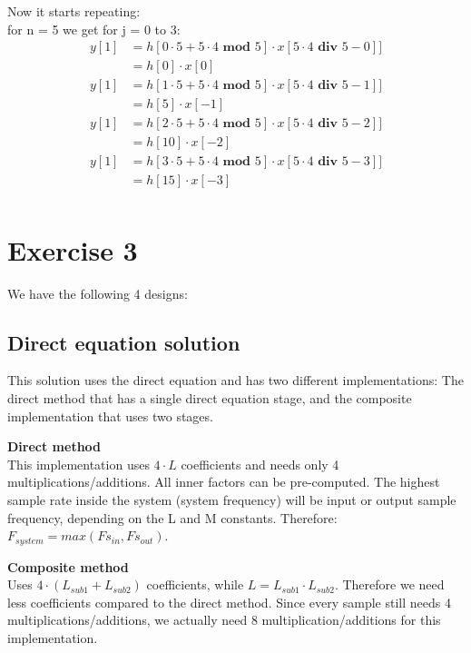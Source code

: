 \documentclass[a4paper,twoside,11pt, fleqn]{article}
\begin{document}
Now it starts repeating:\\

for n = 5 we get for j = 0 to 3:
\begin{align}
y[1] &= h[0\cdot 5 + 5\cdot 4 \textbf{ mod } 5]\cdot x[5\cdot 4 \textbf{ div } 5 - 0]]\\ 
&= h[0]\cdot x[0] \\
y[1] &= h[1\cdot 5 + 5\cdot 4 \textbf{ mod } 5]\cdot x[5\cdot 4 \textbf{ div } 5 - 1]] \\
&= h[5]\cdot x[-1] \\
y[1] &= h[2\cdot 5 + 5\cdot 4 \textbf{ mod } 5]\cdot x[5\cdot 4 \textbf{ div } 5 - 2]] \\
&= h[10]\cdot x[-2] \\
y[1] &= h[3\cdot 5 + 5\cdot 4 \textbf{ mod } 5]\cdot x[5\cdot 4 \textbf{ div } 5 - 3]] \\
&= h[15]\cdot x[-3] \\
\end{align}


\newpage
\section{Exercise 3}
We have the following 4 designs: 

\subsection{Direct equation solution}
This solution uses the direct equation and has two different implementations: The direct method that has a single direct equation stage, and the composite implementation that uses two stages.

\smallskip
\textbf{Direct method}\\
This implementation uses $4\cdot L$ coefficients and needs only 4 multiplications/additions. All inner factors can be pre-computed.
\smallskip
The highest sample rate inside the system (system frequency) will be input or output sample frequency, depending on the L and M constants. Therefore: $F_{system} = max(Fs_{in}, Fs_{out})$.
 
\smallskip 
\textbf{Composite method}\\
Uses $4\cdot (L_{sub1} + L_{sub2})$ coefficients, while $L = L_{sub1} \cdot L_{sub2}$. Therefore we need less coefficients compared to the direct method. Since every sample still needs 4 multiplications/additions, we actually need 8 multiplication/additions for this implementation.
\end{document}
